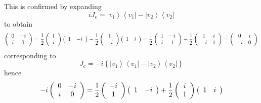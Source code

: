 \documentclass[aps,preprint]{revtex4}%
\begin{document}
This is confirmed by expanding
\begin{equation}
iJ_{e}=\left\vert v_{1}\right\rangle \left\langle v_{1}\right\vert -\left\vert
v_{2}\right\rangle \left\langle v_{2}\right\vert
\end{equation}
to obtain%
\begin{equation}
\left(
\begin{array}
[c]{cc}%
0 & -i\\
i & 0
\end{array}
\right)  =\frac{1}{2}\left(
\begin{array}
[c]{c}%
1\\
i
\end{array}
\right)  \left(
\begin{array}
[c]{cc}%
1 & -i
\end{array}
\right)  -\frac{1}{2}\left(
\begin{array}
[c]{c}%
1\\
-i
\end{array}
\right)  \left(
\begin{array}
[c]{cc}%
1 & i
\end{array}
\right)  =\frac{1}{2}\left(
\begin{array}
[c]{cc}%
1 & -i\\
i & 1
\end{array}
\right)  -\frac{1}{2}\left(
\begin{array}
[c]{cc}%
1 & i\\
-i & 1
\end{array}
\right)  =\left(
\begin{array}
[c]{cc}%
0 & i\\
-i & 0
\end{array}
\right)
\end{equation}
corresponding to
\begin{equation}
J_{e}=-i\left\{  \left\vert v_{1}\right\rangle \left\langle v_{1}\right\vert
-\left\vert v_{2}\right\rangle \left\langle v_{2}\right\vert \right\}
\end{equation}
hence
\begin{equation}
-i\left(
\begin{array}
[c]{cc}%
0 & -i\\
i & 0
\end{array}
\right)  =\frac{1}{2}\left(
\begin{array}
[c]{c}%
-i\\
1
\end{array}
\right)  \left(
\begin{array}
[c]{cc}%
1 & -i
\end{array}
\right)  +\frac{1}{2}\left(
\begin{array}
[c]{c}%
i\\
1
\end{array}
\right)  \left(
\begin{array}
[c]{cc}%
1 & i
\end{array}
\right)
\end{equation}
\end{document}
